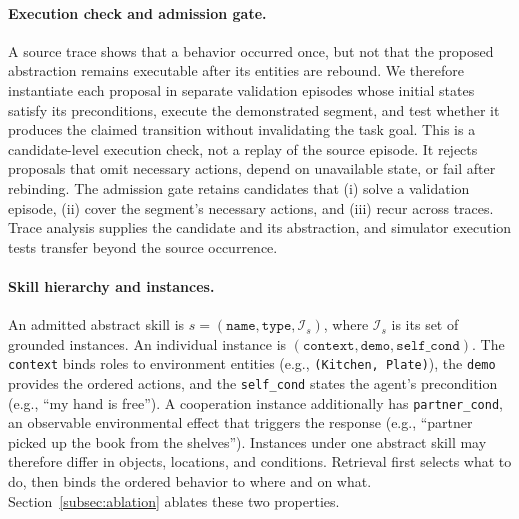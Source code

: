 \documentclass{article}
\theoremstyle{plain}
\theoremstyle{definition}
\theoremstyle{remark}
\begin{document}
\paragraph{Execution check and admission gate.}
A source trace shows that a behavior occurred once, but not that the proposed abstraction remains executable after its entities are rebound. We therefore instantiate each proposal in separate validation episodes whose initial states satisfy its preconditions, execute the demonstrated segment, and test whether it produces the claimed transition without invalidating the task goal. This is a candidate-level execution check, not a replay of the source episode. It rejects proposals that omit necessary actions, depend on unavailable state, or fail after rebinding. The admission gate retains candidates that (i) solve a validation episode, (ii) cover the segment's necessary actions, and (iii) recur across traces. Trace analysis supplies the candidate and its abstraction, and simulator execution tests transfer beyond the source occurrence.

\paragraph{Skill hierarchy and instances.}
An admitted abstract skill is $s=(\texttt{name},\texttt{type},\mathcal{I}_s)$, where $\mathcal{I}_s$ is its set of grounded instances. An individual instance is $(\texttt{context},\texttt{demo},\texttt{self\_cond})$. The \texttt{context} binds roles to environment entities (e.g., \texttt{(Kitchen, Plate)}), the \texttt{demo} provides the ordered actions, and the \texttt{self\_cond} states the agent's precondition (e.g., ``my hand is free''). A cooperation instance additionally has \texttt{partner\_cond}, an observable environmental effect that triggers the response (e.g., ``partner picked up the book from the shelves''). Instances under one abstract skill may therefore differ in objects, locations, and conditions. Retrieval first selects what to do, then binds the ordered behavior to where and on what. Section~\ref{subsec:ablation} ablates these two properties.
\end{document}
